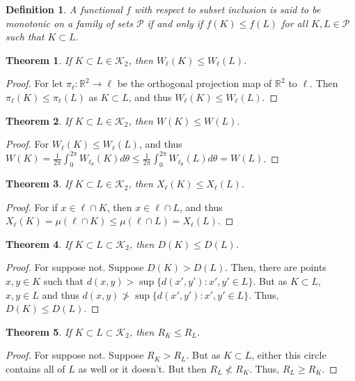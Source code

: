 \documentclass[crop=false,class=book]{standalone}
\theoremstyle{mystyle}
\newtheorem{theorem}{Theorem}[section]
\newtheorem{definition}{Definition}[section]
\begin{document}
\begin{definition}
A functional $f$ with respect to subset inclusion is said to be monotonic on a family of sets $\mathscr{P}$ if and only if $f(K)\leq f(L)$ for all $K,L \in \mathscr{P}$ such that $K\subset L$.
\end{definition}
\begin{theorem}
If $K\subset L \in \mathscr{K}_2$, then $W_{\ell}(K) \leq W_{\ell}(L)$.
\end{theorem}
\begin{proof}
For let $\pi_{\ell}:\mathbb{R}^2 \rightarrow \ell$ be the orthogonal projection map of $\mathbb{R}^2$ to $\ell$. Then $\pi_{\ell}(K)\leq \pi_{\ell}(L)$ as $K\subset L$, and thus $W_{\ell}(K)\leq W_{\ell}(L)$.
\end{proof}
\begin{theorem}
If $K\subset L\in \mathscr{K}_2$, then $W(K)\leq W(L)$.
\end{theorem}
\begin{proof}
For $W_{\ell}(K)\leq W_{\ell}(L)$, and thus $W(K)=\frac{1}{2\pi}\int_{0}^{2\pi}W_{\ell_{\theta}}(K)d\theta \leq \frac{1}{2\pi}\int_{0}^{2\pi}W_{\ell_{\theta}}(L)d\theta=W(L)$.
\end{proof}
\begin{theorem}
If $K\subset L\in \mathscr{K}_2$, then $X_{\ell}(K)\leq X_{\ell}(L)$.
\end{theorem}
\begin{proof}
For if $x\in \ell\cap K$, then $x\in \ell\cap L$, and thus $X_{\ell}(K)=\mu(\ell\cap K) \leq \mu(\ell\cap L)=X_{\ell}(L)$.
\end{proof}
\begin{theorem}
If $K\subset L\subset \mathscr{K}_2$, then $D(K)\leq D(L)$.
\end{theorem}
\begin{proof}
For suppose not. Suppose $D(K)>D(L)$. Then, there are points $x,y\in K$ such that $d(x,y)> \sup\{d(x',y'):x',y'\in L\}$. But as $K\subset L$, $x,y\in L$ and thus $d(x,y) \not> \sup\{d(x',y'):x',y'\in L\}$. Thus, $D(K)\leq D(L)$.
\end{proof}
\begin{theorem}
If $K\subset L \subset \mathscr{K}_2$, then $R_K\leq R_L$.
\end{theorem}
\begin{proof}
For suppose not. Suppose $R_K>R_L$. But as $K\subset L$, either this circle contains all of $L$ as well or it doesn't. But then $R_L \not<R_K$. Thus, $R_L\geq R_K$.
\end{proof}
\end{document}
